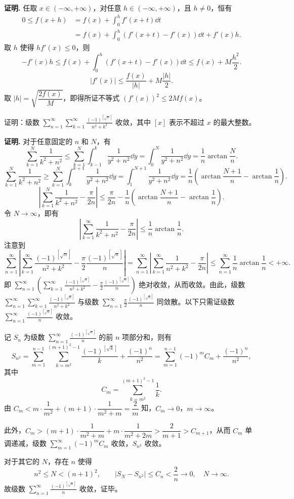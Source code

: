 \begin{solution}
\textbf{证明.} 任取 $x\in(-\infty,+\infty)$，对任意 $h\in(-\infty,+\infty)$，且 $h\ne0$，恒有
\begin{align*}
0\le f(x+h) &= f(x)+\int_0^h f'(x+t)\dd t\\
&= f(x)+\int_0^h\left(f'(x+t)-f'(x)\right)\dd t+f'(x)h.
\end{align*}
取 $h$ 使得 $hf'(x)\le0$，则
\[ -f'(x)h\le f(x)+\int_0^h\left(f'(x+t)-f'(x)\right)\dd t\le f(x)+M\frac{h^2}{2}. \]
\[ |f'(x)|\le\frac{f(x)}{|h|}+M\frac{|h|}{2}. \]
取 $|h|=\sqrt{\dfrac{2f(x)}{M}}$，即得所证不等式 $(f'(x))^2\le2Mf(x)$。
\end{solution}

证明：级数 $\displaystyle\sum_{n=1}^{\infty}\sum_{k=1}^{\infty}\frac{(-1)^{[\sqrt{n}]}}{n^2+k^2}$ 收敛，其中 $[x]$ 表示不超过 $x$ 的最大整数。

\begin{solution}
\textbf{证明.} 对于任意固定的 $n$ 和 $N$，有
\[ \sum_{k=1}^{N}\frac{1}{k^2+n^2}\le\sum_{k=1}^{N}\int_{k-1}^{k}\frac{1}{y^2+n^2}\dd y=\int_0^N\frac{1}{y^2+n^2}\dd y=\frac{1}{n}\arctan\frac{N}{n}. \]
\[ \sum_{k=1}^{N}\frac{1}{k^2+n^2}\ge\sum_{k=1}^{N}\int_{k}^{k+1}\frac{1}{y^2+n^2}\dd y=\int_1^{N+1}\frac{1}{y^2+n^2}\dd y=\frac{1}{n}\left(\arctan\frac{N+1}{n}-\arctan\frac{1}{n}\right). \]
\[ \left|\sum_{k=1}^{N}\frac{1}{k^2+n^2}-\frac{\pi}{2n}\right|\le\frac{\pi}{2n}-\frac{1}{n}\left(\arctan\frac{N+1}{n}-\arctan\frac{1}{n}\right). \]
令 $N\to\infty$，即有
\[ \left|\sum_{k=1}^{\infty}\frac{1}{k^2+n^2}-\frac{\pi}{2n}\right|\le\frac{1}{n}\arctan\frac{1}{n}. \]
注意到
\[ \sum_{n=1}^{\infty}\left|\sum_{k=1}^{\infty}\frac{(-1)^{[\sqrt{n}]}}{n^2+k^2}-\frac{\pi}{2}\frac{(-1)^{[\sqrt{n}]}}{n}\right|=\sum_{n=1}^{\infty}\left|\sum_{k=1}^{\infty}\frac{1}{n^2+k^2}-\frac{\pi}{2n}\right|\le\sum_{n=1}^{\infty}\frac{1}{n}\arctan\frac{1}{n}<+\infty. \]
即 $\displaystyle\sum_{n=1}^{\infty}\left(\sum_{k=1}^{\infty}\frac{(-1)^{[\sqrt{n}]}}{n^2+k^2}-\frac{\pi}{2}\frac{(-1)^{[\sqrt{n}]}}{n}\right)$ 绝对收敛，从而收敛。由此，级数 $\displaystyle\sum_{n=1}^{\infty}\sum_{k=1}^{\infty}\frac{(-1)^{[\sqrt{n}]}}{n^2+k^2}$ 与级数 $\displaystyle\sum_{n=1}^{\infty}\frac{\pi}{2}\frac{(-1)^{[\sqrt{n}]}}{n}$ 同敛散。以下只需证级数 $\displaystyle\sum_{n=1}^{\infty}\frac{(-1)^{[\sqrt{n}]}}{n}$ 收敛。

记 $S_n$ 为级数 $\displaystyle\sum_{n=1}^{\infty}\frac{(-1)^{[\sqrt{n}]}}{n}$ 的前 $n$ 项部分和，则有
\[ S_{n^2}=\sum_{m=1}^{n-1}\sum_{k=m^2}^{(m+1)^2-1}\frac{(-1)^{[\sqrt{k}]}}{k}+\frac{(-1)^n}{n^2}=\sum_{m=1}^{n-1}(-1)^mC_m+\frac{(-1)^n}{n^2}, \]
其中
\[ C_m=\sum_{k=m^2}^{(m+1)^2-1}\frac{1}{k}. \]
由 $C_m<m\cdot\dfrac{1}{m^2}+(m+1)\cdot\dfrac{1}{m^2+m}=\dfrac{2}{m}$ 知，$C_m\to0$，$m\to\infty$。

此外，$C_m>(m+1)\cdot\dfrac{1}{m^2+m}+m\cdot\dfrac{1}{m^2+2m}>\dfrac{2}{m+1}>C_{m+1}$，从而 $C_m$ 单调递减，级数 $\displaystyle\sum_{m=1}^{\infty}(-1)^mC_m$ 收敛，$S_{n^2}$ 收敛。

对于其它的 $N$，存在 $n$ 使得
\[ n^2\le N<(n+1)^2,\qquad |S_N-S_{n^2}|\le C_n<\frac{2}{n}\to0,\quad N\to\infty. \]
故级数 $\displaystyle\sum_{n=1}^{\infty}\frac{(-1)^{[\sqrt{n}]}}{n}$ 收敛，证毕。
\end{solution}

